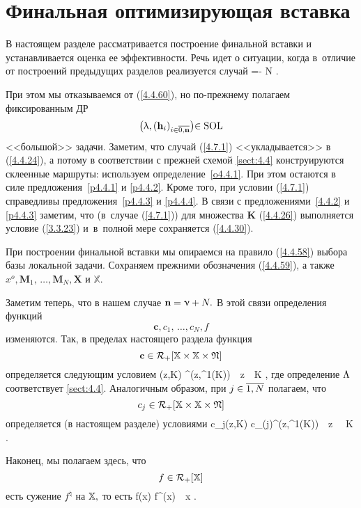 
\section{
  Финальная оптимизирующая вставка
}
\label{sect:4.7}
\setcounter{equation}{0}

В настоящем разделе рассматривается построение финальной вставки
и устанавливается оценка ее эффективности.
Речь идет о ситуации, когда в~отличие от построений предыдущих
разделов реализуется случай
\bfn
  \label{4.7.1}
  \nu =\nn - N
  .
\efn

При этом мы отказываемся от (\ref{4.4.60}),
но по-прежнему полагаем фиксированным ДР
$$
  \bigl(\la,(\mathbf{h}_i)_{i\in\ov{0,\nn}}\bigl)\in \mathrm{SOL}
$$
<<большой>> задачи.
Заметим, что случай (\ref{4.7.1})
<<укладывается>> в (\ref{4.4.24}),
а потому в соответствии с прежней схемой \ref{sect:4.4}
конструируются склеенные маршруты:
используем определение~\ref{o4.4.1}.
При этом остаются в силе предложения~\ref{p4.4.1} и \ref{p4.4.2}.
Кроме того, при условии (\ref{4.7.1})
справедливы предложения~\ref{p4.4.3} и \ref{p4.4.4}.
В связи с предложениями~\ref{4.4.2} и \ref{p4.4.3}
заметим, что
(в~случае (\ref{4.7.1}))
для множества $\mathbf{K}$ (\ref{4.4.26})
выполняется условие (\ref{3.3.23})
и~в~полной мере сохраняется (\ref{4.4.30}).

При построении финальной вставки мы опираемся на правило (\ref{4.4.58})
выбора базы локальной задачи.
Сохраняем прежними обозначения (\ref{4.4.59}),
а также
$x^o,\mathbf{M}_1,\,\ldots,\mathbf{M}_N,\mathbf{X}$ и
$\mathbb{X}.$

Заметим теперь, что в нашем случае
${\mathbf n}=\upnu+N.$
В этой связи определения функций
$$
  \mathbf{c},c_1,\,\ldots,c_N,f
$$
изменяются.
Так, в пределах настоящего раздела функция
$$
  \mathbf{c}\in {\cal R}_+[{\mathbb X} \times {\mathbb X}\times \mathfrak{N}]
$$
определяется следующим условием
\bfn
  \label{4.7.2}
  (z,K) \df {}^\natural\bigl(z,\La^1(K)\bigl)\ \
  \fa z\in \bbx\times \bbx\ \ \fa K\in {}
  ,
\efn
где определение $\Lambda$ соответствует \ref{sect:4.4}.
Аналогичным образом, при $j\in\ov{1,N}$
полагаем, что
$$
  c_j \in {\cal R}_+[{\mathbb X}\times {\mathbb X}\times \mathfrak{N}]
$$
определяется
(в настоящем разделе)
условиями
\bfn
  \label{4.7.3}
  c_j(z,K) \df c_{\La(j)}^\natural\bigl(z,\La^1(K)\bigl)\ \ \fa z\in
  \bbx\times \bbx\ \ \fa K\in \mathfrak{N}
  .
\efn

Наконец, мы полагаем здесь, что
$$
  f\in {\cal R}_+[{\mathbb X}]
$$
есть сужение $f^\natural$ на ${\mathbb X},$
то есть
\bfn
  \label{4.7.4}
  f(x) \df f^\natural(x)\ \ \fa x\in \bbx
  .
\efn

